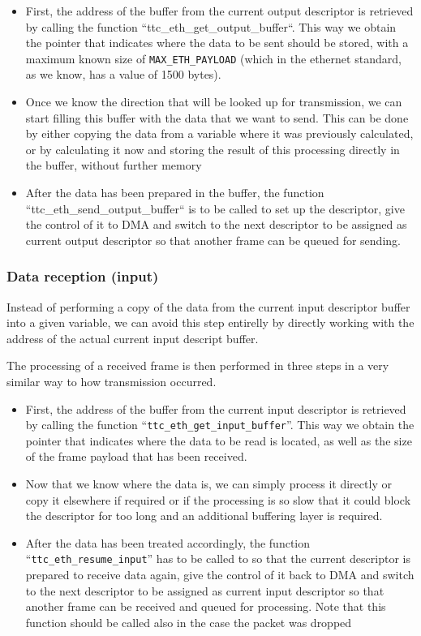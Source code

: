\begin{itemize}
  \item First, the address of the buffer from the current output descriptor is retrieved by calling the function ``ttc\_eth\_get\_output\_buffer``. This way we obtain the pointer that indicates where the data to be sent should be stored, with a maximum known size of \verb/MAX_ETH_PAYLOAD/ (which in the ethernet standard, as we know, has a value of 1500 bytes).
  \item Once we know the direction that will be looked up for transmission, we can start filling this buffer with the data that we want to send. This can be done by either copying the data from a variable where it was previously calculated, or by calculating it now and storing the result of this processing directly in the buffer, without further memory
  \item After the data has been prepared in the buffer, the function ``ttc\_eth\_send\_output\_buffer`` is to be called to set up the descriptor, give the control of it to DMA and switch to the next descriptor to be assigned as current output descriptor so that another frame can be queued for sending.
\end{itemize}


\subsubsection {Data reception (input)}
\label{eth_input}

Instead of performing a copy of the data from the current input descriptor buffer into a given variable, we can avoid this step entirelly by directly working with the address of the actual current input descript buffer.

The processing of a received frame is then performed in three steps in a very similar way to how transmission occurred.

\begin{itemize}
  \item First, the address of the buffer from the current input descriptor is retrieved by calling the function ``\verb/ttc_eth_get_input_buffer/''. This way we obtain the pointer that indicates where the data to be read is located, as well as the size of the frame payload that has been received.
  \item Now that we know where the data is, we can simply process it directly or copy it elsewhere if required or if the processing is so slow that it could block the descriptor for too long and an additional buffering layer is required.
    
  \item After the data has been treated accordingly, the function ``\verb/ttc_eth_resume_input/'' has to be called to so that the current descriptor is prepared to receive data again, give the control of it back to DMA and switch to the next descriptor to be assigned as current input descriptor so that another frame can be received and queued for processing.
    Note that this function should be called also in the case the packet was dropped
\end{itemize}

